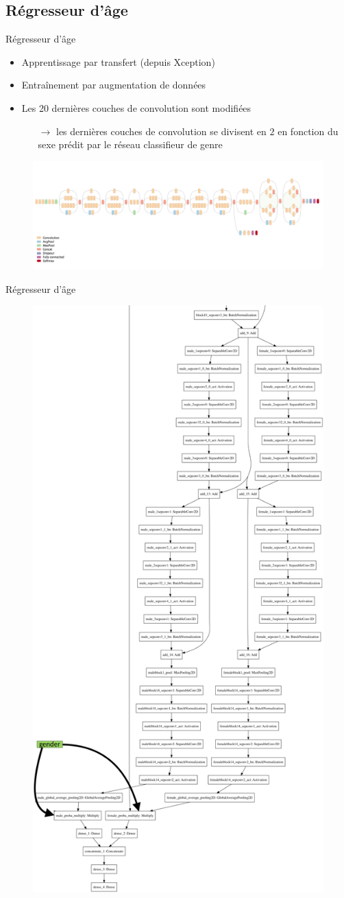 \documentclass[compress]{beamer}
\begin{document}
\subsection{Régresseur d'âge}

\begin{frame}{Régresseur d'âge}
  \begin{itemize}
    \item Apprentissage par transfert (depuis Xception)
    \item Entraînement par augmentation de données
    \item Les 20 dernières couches de convolution sont modifiées
    \begin{itemize}
      \item[$\rightarrow$] les dernières couches de convolution {\color{fibeamer@orange}se divisent en $2$ en fonction du sexe prédit par le réseau classifieur de genre}
    \end{itemize}
  \end{itemize}
    \begin{figure}
      \includegraphics[width=\linewidth]{resources/Xception}
    \end{figure}
\end{frame}

\begin{frame}{Régresseur d'âge}
  \vspace{-.11\linewidth}
  \begin{figure}
    \centering\hspace{.1\linewidth}
    \includegraphics[width=0.4\linewidth]{resources/age_regressor}
  \end{figure}
\end{frame}
\end{document}
